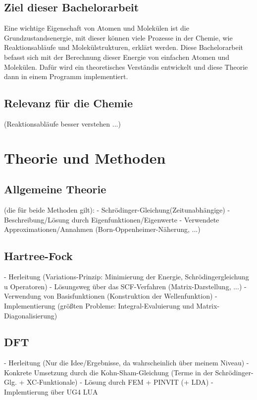 \documentclass[a4paper, 12pt]{report}
\begin{document}
\section{Ziel dieser Bachelorarbeit}
Eine wichtige Eigenschaft von Atomen und Molekülen ist die Grundzustandsenergie, 
mit dieser können viele Prozesse in der Chemie,
wie Reaktionsabläufe und Molekülstrukturen, erklärt werden.
Diese Bachelorarbeit befasst sich mit der Berechnung 
dieser Energie von einfachen Atomen und Molekülen.
Dafür wird ein theoretisches Verständis entwickelt 
und diese Theorie dann in einem Programm implementiert.

\section{Relevanz für die Chemie}
(Reaktionsabläufe besser verstehen ...)

\chapter{Theorie und Methoden}
\section{Allgemeine Theorie}
(die für beide Methoden gilt):
- Schrödinger-Gleichung(Zeitunabhängige)
- Beschreibung/Lösung durch Eigenfunktionen/Eigenwerte
- Verwendete Approximationen/Annahmen (Born-Oppenheimer-Näherung, ...)

\section{Hartree-Fock}
- Herleitung (Variations-Prinzip: Minimierung der Energie,
Schrödingergleichung u Operatoren)
- Lösungsweg über das SCF-Verfahren (Matrix-Darstellung, ...)
- Verwendung von Basisfunktionen (Konstruktion der Wellenfunktion)
- Implementierung (größten Probleme: Integral-Evaluierung und
Matrix-Diagonalisierung)

\section{DFT}
- Herleitung (Nur die Idee/Ergebnisse, da wahrscheinlich über
meinem Niveau)
- Konkrete Umsetzung durch die Kohn-Sham-Gleichung (Terme in der
Schrödinger-Glg. + XC-Funktionale)
- Lösung durch FEM + PINVIT (+ LDA)
- Implemtierung über UG4 LUA
\end{document}
